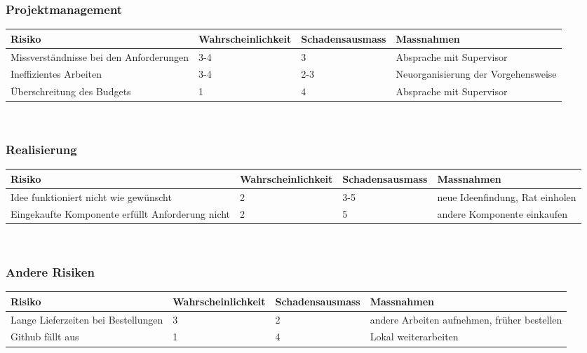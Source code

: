 \subsubsection{Projektmanagement}
\begin{table}[htbp]
\begin{tabular}{|p{3cm}|p{3cm}|p{3cm}|p{4cm}|}\hline
	
	\textbf{Risiko}	& 	\textbf{Wahrscheinlichkeit} & \textbf{Schadensausmass}  & \textbf{Massnahmen} \\\hline
		Missverständnisse bei den Anforderungen	&	3-4	&	3	& Absprache mit Supervisor  \\\hline
	Ineffizientes Arbeiten	&	3-4	&	2-3	& Neuorganisierung der Vorgehensweise  \\\hline
	
	Überschreitung des Budgets	&	1	&	4	& Absprache mit Supervisor  \\\hline
\end{tabular}\\
\end{table}

\subsubsection{Realisierung}
\begin{table}[htbp]
\begin{tabular}{|p{3cm}|p{3cm}|p{3cm}|p{4cm}|}\hline
	
	\textbf{Risiko}	& 	\textbf{Wahrscheinlichkeit} & \textbf{Schadensausmass}  & \textbf{Massnahmen} \\\hline
	
	Idee funktioniert nicht wie gewünscht	&	2	&	3-5	& neue Ideenfindung, Rat einholen  \\\hline
	Eingekaufte Komponente erfüllt Anforderung nicht	&	2	&	5	& andere Komponente einkaufen  \\\hline
\end{tabular}\\
\end{table}

\subsubsection{Andere Risiken}
\begin{table}[htbp]
\begin{tabular}{|p{3cm}|p{3cm}|p{3cm}|p{4cm}|}\hline
	
	\textbf{Risiko}	& 	\textbf{Wahrscheinlichkeit} & \textbf{Schadensausmass}  & \textbf{Massnahmen} \\\hline
	
	Lange Lieferzeiten bei Bestellungen	&	3	&	2	& andere Arbeiten aufnehmen, früher bestellen  \\\hline
	Github fällt aus	&	1	&	4	& Lokal weiterarbeiten  \\\hline
\end{tabular}\\
\end{table}

